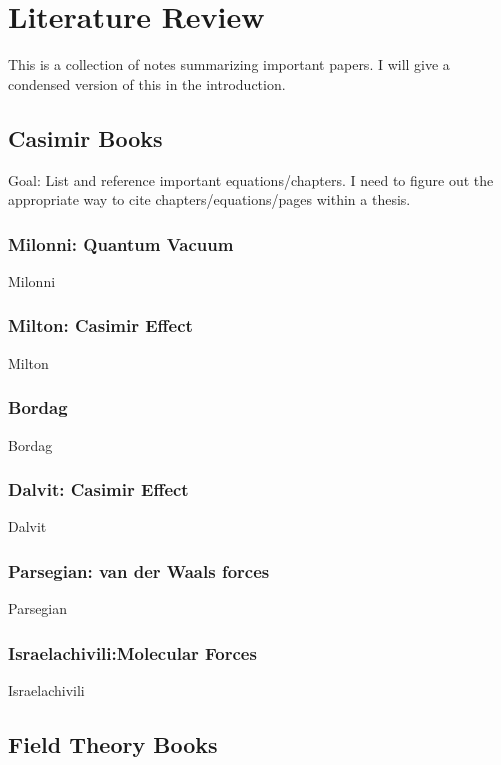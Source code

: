 \chapter{Literature Review}

This is a collection of notes summarizing important papers.  I will give a condensed version of this in the introduction.  

\section{Casimir Books}

Goal: List and reference important equations/chapters.  
I need to figure out the appropriate way to cite chapters/equations/pages within a thesis.  

\subsection{Milonni: Quantum Vacuum}

Milonni~\cite{Milonni1994}

\subsection{Milton: Casimir Effect}
Milton~\cite{Milton2001}

\subsection{Bordag}
Bordag~\cite{Bordag2009}

\subsection{Dalvit: Casimir Effect}
Dalvit~\cite{Dalvit2011}

\subsection{Parsegian: van der Waals forces}

Parsegian~\cite{Parsegian2006}



\subsection{Israelachivili:Molecular Forces}

Israelachivili~\cite{Israelachvili2011}

\section{Field Theory Books}

